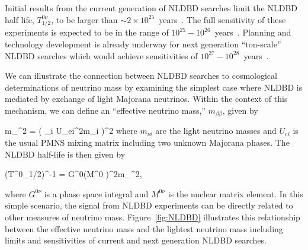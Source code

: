 Initial results from the current generation of NLDBD searches limit the NLDBD half life, $T^{0\nu}_{1/2}$, to be larger than  $\sim2\times10^{25}$~years~\cite{Agostini:2013mzu,Auger:2012ar,Artusa:2014lgv}.%
 The full sensitivity of these experiments is expected to be in the range of $10^{25}-10^{26}$~years~\cite{Geesaman:2015fha}. Planning and technology development is already underway for next generation ``ton-scale'' NLDBD searches which would achieve sensitivities of $10^{27}-10^{28}$~years~\cite{Geesaman:2015fha}.

We can illustrate the connection between NLDBD searches to cosmological determinations of neutrino mass by examining the simplest case where NLDBD is mediated by exchange of light Majorana neutrinos. Within the context of this mechanism, we can define an ``effective neutrino mass,'' $m_{\beta\beta}$, given by 

\beq
m_{\beta\beta}^{2} = ( \sum_i U_{ei}^{2}m_{\nu i} )^{2}
\label{eq:mbb}
\eeq
where $m_{\nu i}$ are the light neutrino masses and $U_{ei}$ is the usual PMNS mixing matrix including two unknown Majorana phases. The NLDBD half-life is then given by 

\beq
(T^{0\nu}_{1/2})^{-1} = G^{0\nu}\cdot (M^{0\nu} )^{2}\cdot m_{\beta\beta}^2,
\eeq

where $G^{0\nu}$ is a phase space integral and $M^{0\nu}$ is the nuclear matrix element. In this simple scenario, the signal from NLDBD experiments can be directly related to other measures of neutrino mass. Figure~\ref{fig:NLDBD} illustrates this relationship between the effective neutrino mass and the lightest neutrino mass including limits and sensitivities of current and next generation NLDBD searches.


